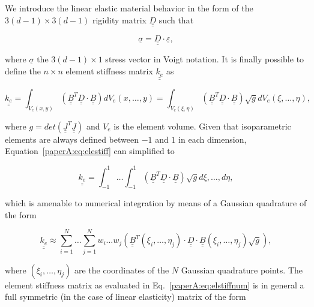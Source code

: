 We introduce the linear elastic material behavior in the form of the $3\left(d-1\right)\times 3\left(d-1\right)$ rigidity matrix $\underline{\underline{D}}$ such that

\begin{equation}
\underline{\sigma}=\underline{\underline{D}}\cdot\underline{\varepsilon},
\end{equation}

where $\underline{\sigma}$ the $3\left(d-1\right)\times 1$ stress vector in Voigt notation. It is finally possible to define the $n\times n$ element stiffness matrix $\underline{\underline{k_{e}}}$ as

\begin{equation}\label{paperA:eq:elestiff}
\underline{\underline{k_{e}}}=\int_{V_{e}\left(x,y\right)}\left(\underline{\underline{B}}^{T}\underline{\underline{D}}\cdot\underline{\underline{B}}\right)dV_{e}\left(x,\dots,y\right)=\int_{V_{e}\left(\xi,\eta\right)}\left(\underline{\underline{B}}^{T}\underline{\underline{D}}\cdot\underline{\underline{B}}\right)\sqrt{g}dV_{e}\left(\xi,\dots,\eta\right),
\end{equation}

where $g=det\left(\underline{\underline{J}}^{T}\underline{\underline{J}}\right)$ and $V_{e}$ is the element volume. Given that isoparametric elements are always defined between $-1$ and $1$ in each dimension, Equation~\ref{paperA:eq:elestiff} can simplified to

\begin{equation}
\underline{\underline{k_{e}}}=\int_{-1}^{1}\dots\int_{-1}^{1}\left(\underline{\underline{B}}^{T}\underline{\underline{D}}\cdot\underline{\underline{B}}\right)\sqrt{g}d\xi,\dots, d\eta,
\end{equation}

which is amenable to numerical integration by means of a Gaussian quadrature of the form

\begin{equation}\label{paperA:eq:elstiffnum}
\underline{\underline{k_{e}}}\approx \sum_{i=1}^{N}\dots\sum_{j=1}^{N}w_{i}\dots w_{j}\left(\underline{\underline{B}}^{T}\left(\xi_{i}, \dots,\eta_{j}\right)\cdot\underline{\underline{D}}\cdot\underline{\underline{B}}\left(\xi_{i}, \dots,\eta_{j}\right)\sqrt{g}\right),
\end{equation}

where $\left(\xi_{i}, \dots,\eta_{j}\right)$ are the coordinates of the $N$ Gaussian quadrature points. The element stiffness matrix as evaluated in Eq.~\ref{paperA:eq:elstiffnum} is in general a full symmetric (in the case of linear elasticity) matrix of the form

